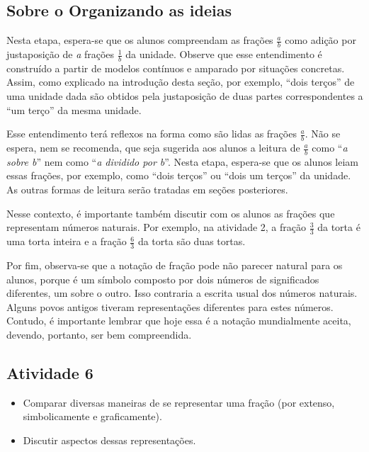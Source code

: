 \subsection{Sobre o Organizando as ideias}



  Nesta etapa, espera-se que os alunos compreendam as frações   $\frac{a}{b}$ como adição por justaposição de   {\it a}   frações   $\frac{1}{b}$ da unidade. Observe que esse entendimento é construído a partir de modelos contínuos e amparado por situações concretas. Assim, como explicado na introdução desta seção, por exemplo,   ``dois terços'' de uma unidade dada são obtidos pela justaposição de duas partes correspondentes a   ``um terço'' da mesma unidade.

  Esse entendimento terá reflexos na forma como são lidas as frações   $\frac{a}{b}$. Não se espera, nem se recomenda, que seja sugerida aos alunos a leitura de   $\frac{a}{b}$ como   ``{\it a sobre b}'' nem como   ``{\it a dividido por b}''. Nesta etapa, espera-se que os alunos leiam essas frações, por exemplo, como   ``dois terços'' ou   ``dois um terços'' da unidade. As outras formas de leitura serão tratadas em seções posteriores.

  Nesse contexto, é importante também discutir com os alunos as frações que representam números naturais. Por exemplo, na atividade 2, a fração   $\frac{3}{3}$ da torta é uma torta inteira e a fração   $\frac{6}{3}$ da torta são duas tortas.

  Por fim, observa-se que a notação de fração pode não parecer natural para os alunos, porque é um símbolo composto por dois números de significados diferentes, um sobre o outro. Isso contraria a escrita usual dos números naturais. Alguns povos antigos tiveram representações diferentes para estes números.  Contudo, é importante lembrar que hoje essa é a notação mundialmente aceita, devendo, portanto, ser bem compreendida.

\Bg


\subsection{Atividade 6}

   \vspace{.1cm}

  \begin{itemize} %
    \item       Comparar diversas maneiras de se representar uma fração (por extenso, simbolicamente e graficamente).
    \item       Discutir aspectos dessas representações.
\end{itemize} %


